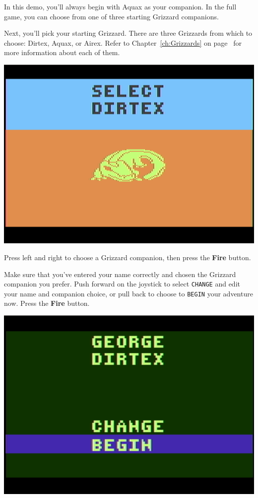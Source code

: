 \documentclass[10pt,twocolumn,openany,article]{memoir}
\begin{document}
\ifdefined\DEMO

In this demo,  you'll always begin with Aquax as  your companion. In the
full game, you can choose from one of three starting Grizzard companions.

\else

Next, you'll pick your starting Grizzard. There are three Grizzards from
which    to    choose:   Dirtex,    Aquax,    or    Airex.   Refer    to
Chapter~\ref{ch:Grizzards}   on  page~\pageref{ch:Grizzards}   for  more
information about each of them.

\begin{center}
  \includegraphics[width=\columnwidth]{../Manual/GrizzardChooserNTSC.png}
\end{center}

Press left  and right  to choose  a Grizzard  companion, then  press the
\textbf{Fire} button.

Make  sure  that you've  entered  your  name  correctly and  chosen  the
Grizzard companion  you prefer. Push  forward on the joystick  to select
\texttt{CHANGE} and edit your name and companion choice, or pull back to
choose    to   \texttt{BEGIN}    your   adventure    now.   Press    the
\textbf{Fire} button.

\begin{center}
  \includegraphics[width=\columnwidth]{../Manual/ConfirmNewGameNTSC.png}
\end{center}
\end{document}
